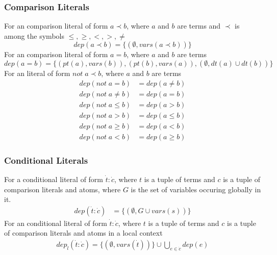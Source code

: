 \documentclass{article}
\newcommand{\tuple}[1]{\dot{#1}}
\newcommand{\set}[1]{\{#1\}}
\newcommand\Provide{\mathit{pt}}
\newcommand\Depend{\mathit{dt}}
\begin{document}
	\subsubsection{Comparison Literals}
	For an comparison literal of form $a \prec b$, where $a$ and $b$ are terms and $\prec$ is among the symbols $\leq,\ge,<,>,\neq$
	\begin{equation*}
		dep(a \prec b) = \set{(\emptyset, vars(a \prec b))}
	\end{equation*}
	For an comparison literal of form $a = b$, where $a$ and $b$ are terms
	\begin{equation*}
		dep(a = b) = \set{(\Provide(a), vars(b)), (\Provide(b), vars(a)), (\emptyset, \Depend(a) \cup \Depend(b))}
	\end{equation*}
	For an literal of form $not \; a \prec b$, where $a$ and $b$ are terms
	\begin{align*}
		dep(not \; a = b) &= dep(a \neq b) \\
		dep(not \; a \neq b) &= dep(a = b) \\
		dep(not \; a \leq b) &= dep(a > b) \\
		dep(not \; a > b) &= dep(a \leq b) \\
		dep(not \; a \ge b) &= dep(a < b) \\
		dep(not \; a < b) &= dep(a \ge b)
	\end{align*}

	\subsubsection{Conditional Literals}
	For a conditional literal of form $\tuple{t} : \tuple{c}$, where $t$ is a tuple of terms and $c$ is a tuple of comparison literals and atoms, where $G$ is the set of variables occuring globally in it.
	\begin{align*}
		dep(\tuple{t} : \tuple{c}) &= \set{(\emptyset, G \cup vars(s))}
	\end{align*}
	For an conditional literal of form $\tuple{t} : \tuple{c}$, where $t$ is a tuple of terms and $c$ is a tuple of comparison literals and atoms in a local context
	\begin{align*}
		dep_l(\tuple{t} : \tuple{c}) = \set{(\emptyset, vars(\tuple{t}))} \cup \bigcup_{e \in \tuple{c}} dep(e)
	\end{align*}
\end{document}

